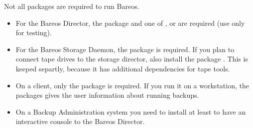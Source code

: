 Not all packages are required to run Bareos.

\begin{itemize}
    \item For the Bareos Director, the package  and one of ,  or  are required (use  only for testing).

    \item For the Bareos Storage Daemon, the package  is required. If you plan to connect tape drives to the storage director, also install the package . This is keeped separtly, because it has additional dependencies  for tape tools.

    \item On a client, only the package  is required. If you run it on a workstation, the packages  gives the user information about running backups.

    \item On a Backup Administration system you need to install at least  to have an interactive console to the Bareos Director.

\end{itemize}

